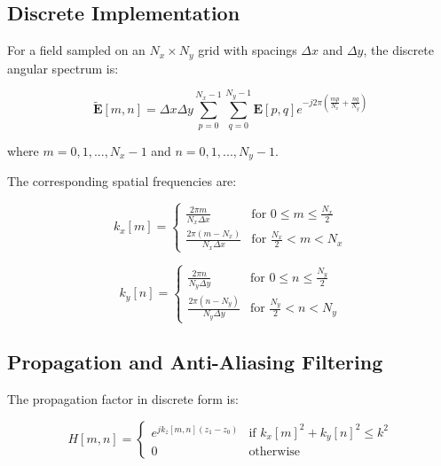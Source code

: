 \documentclass[12pt,a4paper]{article}
\begin{document}
\subsection{Discrete Implementation}

For a field sampled on an $N_x \times N_y$ grid with spacings $\Delta x$ and $\Delta y$, the discrete angular spectrum is:

\begin{equation}
    \tilde{\mathbf{E}}[m,n] = \Delta x \Delta y \sum_{p=0}^{N_x-1} \sum_{q=0}^{N_y-1} \mathbf{E}[p,q] e^{-j2\pi\left(\frac{mp}{N_x} + \frac{nq}{N_y}\right)}
\end{equation}

where $m = 0,1,...,N_x-1$ and $n = 0,1,...,N_y-1$.

The corresponding spatial frequencies are:

\begin{equation}
    k_x[m] =
    \begin{cases}
        \frac{2\pi m}{N_x \Delta x} & \text{for } 0 \leq m \leq \frac{N_x}{2} \\
        \frac{2\pi (m-N_x)}{N_x \Delta x} & \text{for } \frac{N_x}{2} < m < N_x
    \end{cases}
\end{equation}

\begin{equation}
    k_y[n] =
    \begin{cases}
        \frac{2\pi n}{N_y \Delta y} & \text{for } 0 \leq n \leq \frac{N_y}{2} \\
        \frac{2\pi (n-N_y)}{N_y \Delta y} & \text{for } \frac{N_y}{2} < n < N_y
    \end{cases}
\end{equation}

\subsection{Propagation and Anti-Aliasing Filtering}

The propagation factor in discrete form is:

\begin{equation}
    H[m,n] =
    \begin{cases}
        e^{jk_z[m,n](z_1-z_0)} & \text{if } k_x[m]^2 + k_y[n]^2 \leq k^2 \\
        0 & \text{otherwise}
    \end{cases}
\end{equation}
\end{document}
